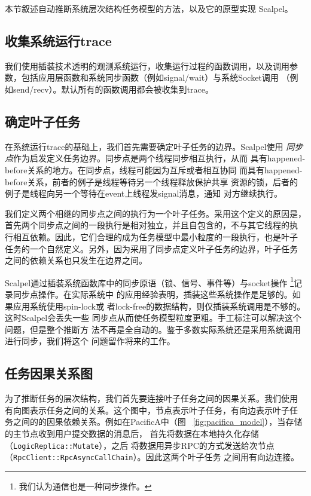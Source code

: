本节叙述自动推断系统层次结构任务模型的方法，以及它的原型实现
\pozhehao{}Scalpel。


\subsection{收集系统运行trace}

我们使用插装技术透明的观测系统运行，收集运行过程的函数调用，以及调用参
数，包括应用层函数和系统同步函数（例如signal/wait）与系统Socket调用
（例如send/recv）。默认所有的函数调用都会被收集到trace。


\subsection{确定叶子任务}

在系统运行trace的基础上，我们首先需要确定叶子任务的边界。Scalpel使用
\emph{同步点}作为启发定义任务边界。同步点是两个线程同步相互执行，从而
具有happened-before关系的地方。在同步点，线程可能因为互斥或者相互协同
而具有happened-before关系，前者的例子是线程等待另一个线程释放保护共享
资源的锁，后者的例子是线程向另一个等待在event上线程发signal消息，通知
对方继续执行。

我们定义两个相继的同步点之间的执行为一个叶子任务。采用这个定义的原因是，
首先两个同步点之间的一段执行是相对独立，并且自包含的，不与其它线程的执
行相互依赖。因此，它们合理的成为任务模型中最小粒度的一段执行，也是叶子
任务的一个自然定义。另外，因为采用了同步点定义叶子任务的边界，叶子任务
之间的依赖关系也只发生在边界之间。

Scalpel通过插装系统函数库中的同步原语（锁、信号、事件等）与socket操作
\footnote{我们认为通信也是一种同步操作。}记录同步点操作。在实际系统中
的应用经验表明，插装这些系统操作是足够的。如果应用系统使用spin-lock或
者lock-free的数据结构，则仅插装系统调用是不够的。这时Scalpel会丢失一些
同步点从而使任务模型粒度更粗。手工标注可以解决这个问题，但是整个推断方
法不再是全自动的。鉴于多数实际系统还是采用系统调用进行同步，我们将这个
问题留作将来的工作。

\subsection{任务因果关系图}


为了推断任务的层次结构，我们首先要连接叶子任务之间的因果关系。我们使用
有向图表示任务之间的关系。这个图中，节点表示叶子任务，有向边表示叶子任
务之间的的因果依赖关系。例如在PacificA中（图
~\ref{fig:pacifica_model}），当存储的主节点收到用户提交数据的消息后，
首先将数据在本地持久化存储（\texttt{Logic\-Replica\-::Mutate}），之后
将数据用异步RPC的方式发送给次节点
（\texttt{Rpc\-Client\-::RpcAsync\-Call\-Chain}）。因此这两个叶子任务
之间用有向边连接。

